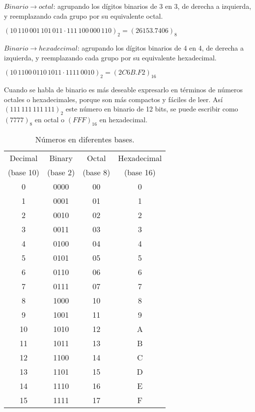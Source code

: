 $Binario \rightarrow octal$: agrupando los d\'{i}gitos binarios de 3 en 3, de
derecha a izquierda, y reemplazando cada grupo por su equivalente octal.
\begin{center} \large $(10\,110\,001\,101\,011 \cdot 111\,100\,000\,110)_2 =
        (26153.7406)_8$ \end{center}

$Binario \rightarrow hexadecimal$: agrupando los d\'{i}gitos binarios de 4 en 4,
de derecha a izquierda, y reemplazando cada grupo por su equivalente
hexadecimal. \begin{center} \large $(10\,1100\,0110\,1011 \cdot 1111\,0010)_2 =
        (2C6B.F2)_{16}$ \end{center}

Cuando se habla de binario es m\'{a}s deseable expresarlo en t\'{e}rminos de
n\'{u}meros octales o hexadecimales, porque son m\'{a}s compactos y f\'{a}ciles
de leer. As\'{i} $(111\,111\,111\,111)_2$ este n\'{u}mero en binario de 12 bits,
se puede escribir como $(7777)_8$ en octal o $(FFF)_{16}$ en hexadecimal.

\medskip

\begin{table}[h] \centering \begin{tabular}{cccc} \toprule Decimal & Binary      &
               Octal                   & Hexadecimal          \\ (base 10) & (base 2) & (base 8) & (base 16) \\ \midrule 0
                                       & 0000        & 00 & 0 \\ 1 & 0001 & 01 & 1 \\ 2 & 0010 & 02 & 2 \\ 3 & 0011 & 03 & 3
               \\ 4 & 0100 & 04 & 4 \\ 5 & 0101 & 05 & 5 \\ 6 & 0110 & 06 & 6 \\ 7 & 0111 & 07
                                       & 7                    \\ 8 & 1000 & 10 & 8 \\ 9 & 1001 & 11 & 9 \\ 10 & 1010 & 12 & A \\ 11 & 1011
                                       & 13          & B      \\ 12 & 1100 & 14 & C \\ 13 & 1101 & 15 & D \\ 14 & 1110 & 16 & E \\ 15
                                       & 1111        & 17 & F \\ \bottomrule\end{tabular} \caption{N\'{u}meros en diferentes
    bases.} \label{tab:numbers} \end{table}

